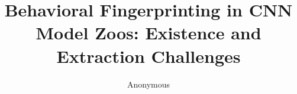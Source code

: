 \documentclass[letterpaper]{article}
\title{Behavioral Fingerprinting in CNN Model Zoos: Existence and Extraction Challenges}
\author{Anonymous}
\date{}
\begin{document}
\maketitle

\begin{abstract}

\end{abstract}

















\end{document}
